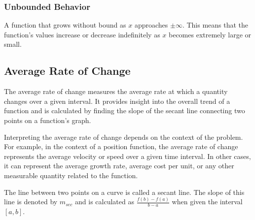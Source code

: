 \documentclass[11pt]{article}
\begin{document}
\begin{center}
\end{center}

\subsubsection*{Unbounded Behavior}
A function that grows without bound as $x$ approaches $\pm\infty$. This means that the function's values increase or decrease indefinitely as $x$ becomes extremely large or small.

\begin{center}
\end{center}

\subsection{Average Rate of Change}

The average rate of change measures the average rate at which a quantity changes over a given interval. It provides insight into the overall trend of a function and is calculated by finding the slope of the secant line connecting two points on a function's graph.

Interpreting the average rate of change depends on the context of the problem. For example, in the context of a position function, the average rate of change represents the average velocity or speed over a given time interval. In other cases, it can represent the average growth rate, average cost per unit, or any other measurable quantity related to the function.

The line between two points on a curve is called a secant line. The slope of this line is denoted by $m_{sec}$ and is calculated as $\frac{f(b) - f(a)}{b-a}$ when given the interval $[a,b]$.
\end{document}
